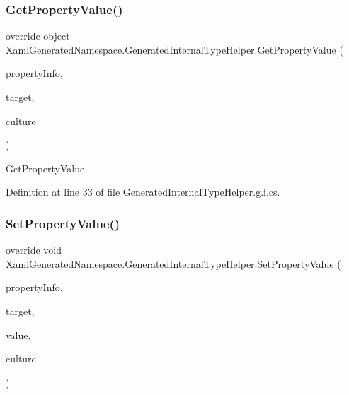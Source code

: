 \mbox{\label{class_xaml_generated_namespace_1_1_generated_internal_type_helper_afdc9fe15b56607d02082908d934480c6}} 
\subsubsection{\texorpdfstring{GetPropertyValue()}{GetPropertyValue()}}
{\footnotesize\ttfamily override object Xaml\+Generated\+Namespace.\+Generated\+Internal\+Type\+Helper.\+Get\+Property\+Value (\begin{DoxyParamCaption}\item[{System.\+Reflection.\+Property\+Info}]{property\+Info,  }\item[{object}]{target,  }\item[{System.\+Globalization.\+Culture\+Info}]{culture }\end{DoxyParamCaption})\hspace{0.3cm}{\ttfamily [protected]}}



Get\+Property\+Value 



Definition at line 33 of file Generated\+Internal\+Type\+Helper.\+g.\+i.\+cs.

\mbox{\label{class_xaml_generated_namespace_1_1_generated_internal_type_helper_ade0f04c0f7b18dd5b170e071d5534d38}} 
\subsubsection{\texorpdfstring{SetPropertyValue()}{SetPropertyValue()}}
{\footnotesize\ttfamily override void Xaml\+Generated\+Namespace.\+Generated\+Internal\+Type\+Helper.\+Set\+Property\+Value (\begin{DoxyParamCaption}\item[{System.\+Reflection.\+Property\+Info}]{property\+Info,  }\item[{object}]{target,  }\item[{object}]{value,  }\item[{System.\+Globalization.\+Culture\+Info}]{culture }\end{DoxyParamCaption})\hspace{0.3cm}{\ttfamily [protected]}}



